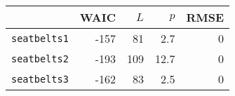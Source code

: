 \begin{tabular}{rrrrr}
  \hline
 & WAIC & $L$ & $p$ & RMSE \\ 
  \hline
\texttt{seatbelts1} & -157 & 81 & 2.7 &  0 \\ 
  \texttt{seatbelts2} & -193 & 109 & 12.7 &  0 \\ 
  \texttt{seatbelts3} & -162 & 83 & 2.5 &  0 \\ 
   \hline
\end{tabular}
